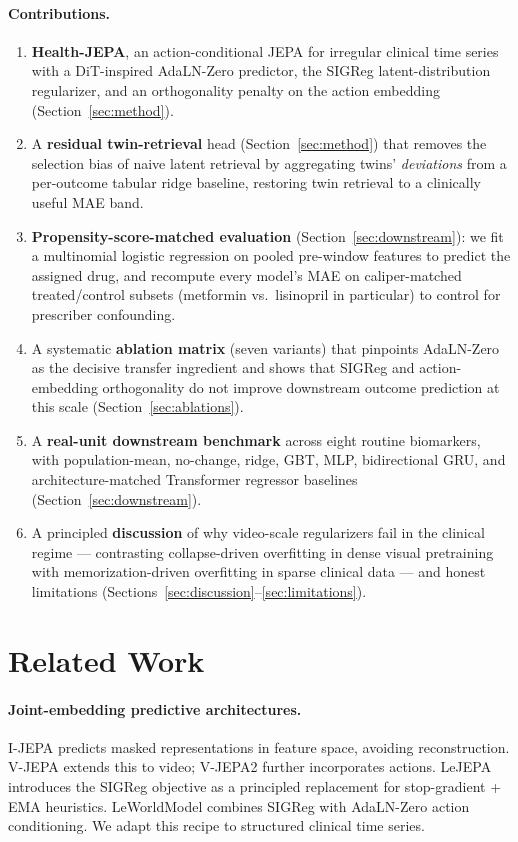 \paragraph{Contributions.}
\begin{enumerate}[leftmargin=*,itemsep=2pt]
  \item \textbf{Health-JEPA}, an action-conditional JEPA for irregular
  clinical time series with a DiT-inspired AdaLN-Zero predictor, the
  SIGReg latent-distribution regularizer, and an orthogonality penalty
  on the action embedding (Section~\ref{sec:method}).
  \item A \textbf{residual twin-retrieval} head (Section~\ref{sec:method})
  that removes the selection bias of naive latent retrieval by
  aggregating twins' \emph{deviations} from a per-outcome tabular ridge
  baseline, restoring twin retrieval to a clinically useful MAE band.
  \item \textbf{Propensity-score-matched evaluation}
  (Section~\ref{sec:downstream}): we fit a multinomial logistic
  regression on pooled pre-window features to predict the assigned drug,
  and recompute every model's MAE on caliper-matched treated/control
  subsets (metformin vs.\ lisinopril in particular) to control for
  prescriber confounding.
  \item A systematic \textbf{ablation matrix} (seven variants) that
  pinpoints AdaLN-Zero as the decisive transfer ingredient and shows
  that SIGReg and action-embedding orthogonality do not improve
  downstream outcome prediction at this scale
  (Section~\ref{sec:ablations}).
  \item A \textbf{real-unit downstream benchmark} across eight routine
  biomarkers, with population-mean, no-change, ridge, GBT, MLP,
  bidirectional GRU, and architecture-matched Transformer regressor
  baselines (Section~\ref{sec:downstream}).
  \item A principled \textbf{discussion} of why video-scale regularizers
  fail in the clinical regime --- contrasting collapse-driven
  overfitting in dense visual pretraining with memorization-driven
  overfitting in sparse clinical data --- and honest limitations
  (Sections~\ref{sec:discussion}--\ref{sec:limitations}).
\end{enumerate}

\section{Related Work}

\paragraph{Joint-embedding predictive architectures.} I-JEPA
\citep{assran2023ijepa} predicts masked representations in feature
space, avoiding reconstruction. V-JEPA \citep{bardes2024vjepa} extends
this to video; V-JEPA2 \citep{assran2025vjepa2} further incorporates
actions. LeJEPA \citep{balestriero2025lejepa} introduces the SIGReg
objective as a principled replacement for stop-gradient + EMA heuristics.
LeWorldModel \citep{maes2026leworldmodel} combines SIGReg with AdaLN-Zero
action conditioning. We adapt this recipe to structured clinical time
series.

